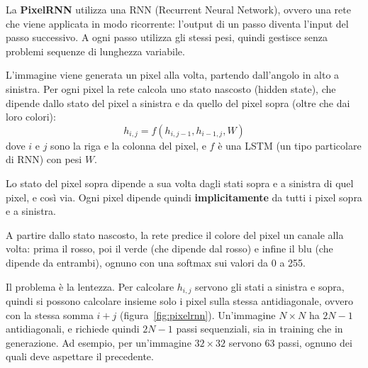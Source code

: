 La \textbf{PixelRNN} \cite{vandenOord2016-PixelRNN} utilizza una RNN (Recurrent Neural Network), ovvero una rete che viene applicata in modo ricorrente: l'output di un passo diventa l'input del passo successivo. A ogni passo utilizza gli stessi pesi, quindi gestisce senza problemi sequenze di lunghezza variabile.

L'immagine viene generata un pixel alla volta, partendo dall'angolo in alto a sinistra. Per ogni pixel la rete calcola uno stato nascosto (hidden state), che dipende dallo stato del pixel a sinistra e da quello del pixel sopra (oltre che dai loro colori):
\[
    h_{i,j} = f(h_{i,j-1}, h_{i-1,j}, W)
\]
dove $i$ e $j$ sono la riga e la colonna del pixel, e $f$ è una LSTM (un tipo particolare di RNN) con pesi $W$.

Lo stato del pixel sopra dipende a sua volta dagli stati sopra e a sinistra di quel pixel, e così via. Ogni pixel dipende quindi \textbf{implicitamente} da tutti i pixel sopra e a sinistra.

A partire dallo stato nascosto, la rete predice il colore del pixel un canale alla volta: prima il rosso, poi il verde (che dipende dal rosso) e infine il blu (che dipende da entrambi), ognuno con una softmax sui valori da 0 a 255.

Il problema è la lentezza. Per calcolare $h_{i,j}$ servono gli stati a sinistra e sopra, quindi si possono calcolare insieme solo i pixel sulla stessa antidiagonale, ovvero con la stessa somma $i + j$ (figura~\ref{fig:pixelrnn}). Un'immagine $N \times N$ ha $2N - 1$ antidiagonali, e richiede quindi $2N - 1$ passi sequenziali, sia in training che in generazione. Ad esempio, per un'immagine $32 \times 32$ servono 63 passi, ognuno dei quali deve aspettare il precedente.

